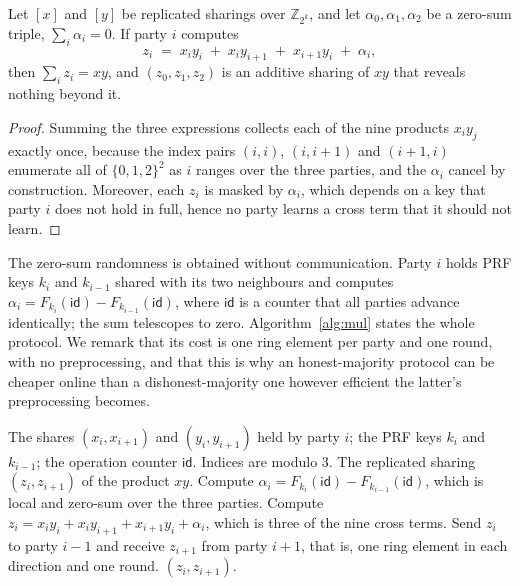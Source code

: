 \documentclass[11pt]{article}
\newcommand{\Z}{\mathbb{Z}}
\begin{document}
\begin{theorem}
\label{thm:mul}
Let $[x]$ and $[y]$ be replicated sharings over $\Z_{2^k}$, and let $\alpha_0,\alpha_1,
\alpha_2$ be a zero-sum triple, $\sum_i \alpha_i = 0$. If party $i$ computes
\[
  z_i \;=\; x_i y_i \;+\; x_i y_{i+1} \;+\; x_{i+1} y_i \;+\; \alpha_i ,
\]
then $\sum_i z_i = xy$, and $(z_0,z_1,z_2)$ is an additive sharing of $xy$ that reveals
nothing beyond it.
\end{theorem}

\begin{proof}
Summing the three expressions collects each of the nine products $x_iy_j$
exactly once, because the index pairs $(i,i)$, $(i,i+1)$ and $(i+1,i)$ enumerate all of
$\{0,1,2\}^2$ as $i$ ranges over the three parties, and the $\alpha_i$ cancel by construction.
Moreover, each $z_i$ is masked by $\alpha_i$, which depends on a key that party $i$ does not
hold in full, hence no party learns a cross term that it should not learn.
\end{proof}

The zero-sum randomness is obtained without communication. Party $i$ holds PRF keys $k_i$
and $k_{i-1}$ shared with its two neighbours and computes
$\alpha_i = F_{k_i}(\mathsf{id}) - F_{k_{i-1}}(\mathsf{id})$, where $\mathsf{id}$ is a
counter that all parties advance identically; the sum telescopes to zero.
Algorithm~\ref{alg:mul} states the whole protocol. We remark that its cost is one ring
element per party and one round, with no preprocessing, and that this is why an
honest-majority protocol can be cheaper online than a dishonest-majority one however
efficient the latter's preprocessing becomes.

\begin{algorithm}[htb]
\caption{Replicated-sharing multiplication}
\label{alg:mul}
\begin{algorithmic}
\REQUIRE The shares $(x_i,x_{i+1})$ and $(y_i,y_{i+1})$ held by party $i$; the PRF keys
$k_i$ and $k_{i-1}$; the operation counter $\mathsf{id}$. Indices are modulo $3$.
\ENSURE The replicated sharing $(z_i,z_{i+1})$ of the product $xy$.
\STATE Compute $\alpha_i = F_{k_i}(\mathsf{id}) - F_{k_{i-1}}(\mathsf{id})$, which is local
and zero-sum over the three parties.
\STATE Compute $z_i = x_iy_i + x_iy_{i+1} + x_{i+1}y_i + \alpha_i$, which is three of the
nine cross terms.
\STATE Send $z_i$ to party $i-1$ and receive $z_{i+1}$ from party $i+1$, that is, one ring
element in each direction and one round.
\RETURN $(z_i, z_{i+1})$.
\end{algorithmic}
\end{algorithm}
\end{document}
